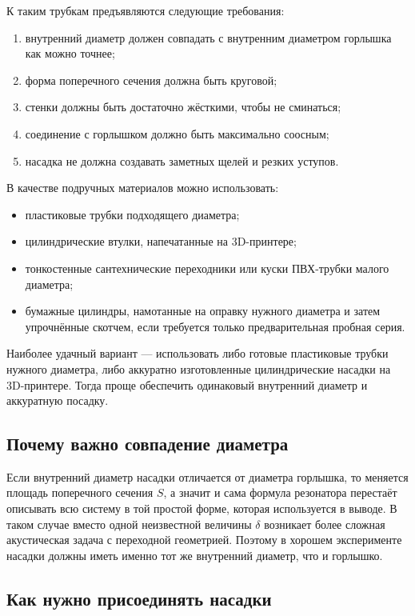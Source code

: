 \documentclass[a4paper,12pt]{article}
\begin{document}
	К таким трубкам предъявляются следующие требования:
	\begin{enumerate}[label=\arabic*)]
		\item внутренний диаметр должен совпадать с внутренним диаметром горлышка как можно точнее;
		\item форма поперечного сечения должна быть круговой;
		\item стенки должны быть достаточно жёсткими, чтобы не сминаться;
		\item соединение с горлышком должно быть максимально соосным;
		\item насадка не должна создавать заметных щелей и резких уступов.
	\end{enumerate}
	
	В качестве подручных материалов можно использовать:
	\begin{itemize}
		\item пластиковые трубки подходящего диаметра;
		\item цилиндрические втулки, напечатанные на 3D-принтере;
		\item тонкостенные сантехнические переходники или куски ПВХ-трубки малого диаметра;
		\item бумажные цилиндры, намотанные на оправку нужного диаметра и затем упрочнённые скотчем, если требуется только предварительная пробная серия.
	\end{itemize}
	
	Наиболее удачный вариант --- использовать либо готовые пластиковые трубки нужного диаметра, либо аккуратно изготовленные цилиндрические насадки на 3D-принтере. Тогда проще обеспечить одинаковый внутренний диаметр и аккуратную посадку.
	
	\subsection{Почему важно совпадение диаметра}
	
	Если внутренний диаметр насадки отличается от диаметра горлышка, то меняется площадь поперечного сечения \(S\), а значит и сама формула резонатора перестаёт описывать всю систему в той простой форме, которая используется в выводе. В таком случае вместо одной неизвестной величины \(\delta\) возникает более сложная акустическая задача с переходной геометрией. Поэтому в хорошем эксперименте насадки должны иметь именно тот же внутренний диаметр, что и горлышко.
	
	\subsection{Как нужно присоединять насадки}
	
\end{document}
